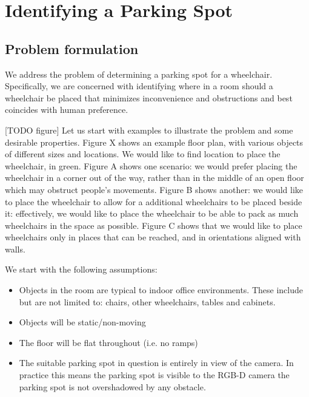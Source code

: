 \chapter{Identifying a Parking Spot}


\section{Problem formulation}
We address the problem of determining a parking spot for a wheelchair.
Specifically, we are concerned with identifying where in a room should a
wheelchair be placed that minimizes inconvenience and obstructions and best
coincides with human preference.

[TODO figure]
Let us start with examples to illustrate the problem and some desirable
properties.
Figure X shows an example floor plan, with various objects of different sizes
and locations. We would like to find location to place the wheelchair, in green.
Figure A shows one scenario: we would prefer placing the wheelchair in a corner
out of the way, rather than in the middle of an open floor which may obstruct
people's movements. Figure B shows another: we would like to place the
wheelchair to allow for a additional wheelchairs to be placed beside it:
effectively, we would like to place the wheelchair to be able to pack as much
wheelchairs in the space as possible. Figure C shows that we would like to place
wheelchairs only in places that can be reached, and in orientations aligned with
walls.

We start with the following assumptions:
\begin{itemize}
\item Objects in the room are typical to indoor office environments. These
include but are not limited to: chairs, other wheelchairs, tables and cabinets.
\item Objects will be static/non-moving
\item The floor will be flat throughout (i.e. no ramps)
\item The suitable parking spot in question is entirely in view of the camera.
In practice this means the parking spot is visible to the RGB-D camera 
the parking spot is not overshadowed by any obstacle.
\end{itemize}


